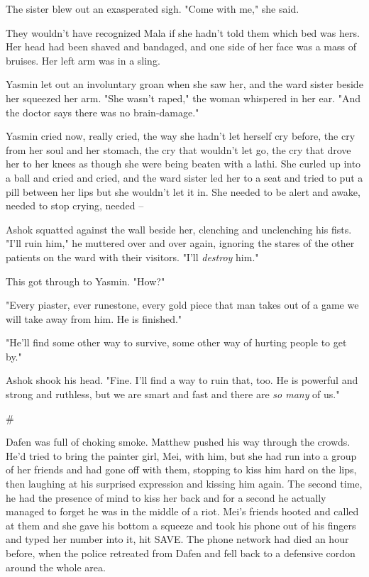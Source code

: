 The sister blew out an exasperated sigh. "Come with me," she said.

They wouldn't have recognized Mala if she hadn't told them which
bed was hers. Her head had been shaved and bandaged, and one side
of her face was a mass of bruises. Her left arm was in a sling.

Yasmin let out an involuntary groan when she saw her, and the ward
sister beside her squeezed her arm. "She wasn't raped," the woman
whispered in her ear. "And the doctor says there was no
brain-damage."

Yasmin cried now, really cried, the way she hadn't let herself cry
before, the cry from her soul and her stomach, the cry that
wouldn't let go, the cry that drove her to her knees as though she
were being beaten with a lathi. She curled up into a ball and cried
and cried, and the ward sister led her to a seat and tried to put a
pill between her lips but she wouldn't let it in. She needed to be
alert and awake, needed to stop crying, needed --

Ashok squatted against the wall beside her, clenching and
unclenching his fists. "I'll ruin him," he muttered over and over
again, ignoring the stares of the other patients on the ward with
their visitors. "I'll \emph{destroy} him."

This got through to Yasmin. "How?"

"Every piaster, ever runestone, every gold piece that man takes out
of a game we will take away from him. He is finished."

"He'll find some other way to survive, some other way of hurting
people to get by."

Ashok shook his head. "Fine. I'll find a way to ruin that, too. He
is powerful and strong and ruthless, but we are smart and fast and
there are \emph{so many} of us."

\#

Dafen was full of choking smoke. Matthew pushed his way through the
crowds. He'd tried to bring the painter girl, Mei, with him, but
she had run into a group of her friends and had gone off with them,
stopping to kiss him hard on the lips, then laughing at his
surprised expression and kissing him again. The second time, he had
the presence of mind to kiss her back and for a second he actually
managed to forget he was in the middle of a riot. Mei's friends
hooted and called at them and she gave his bottom a squeeze and
took his phone out of his fingers and typed her number into it, hit
SAVE. The phone network had died an hour before, when the police
retreated from Dafen and fell back to a defensive cordon around the
whole area.

